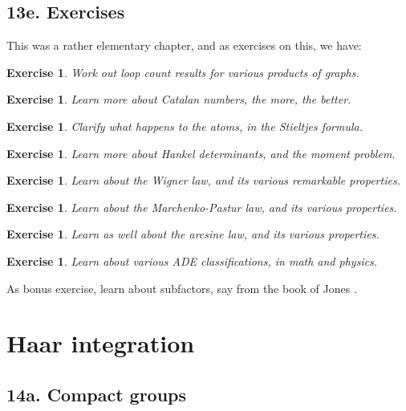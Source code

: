 \documentclass[12pt]{amsbook}
\newtheorem{exercise}[theorem]{Exercise}
\begin{document}
\section*{13e. Exercises}

This was a rather elementary chapter, and as exercises on this, we have:

\begin{exercise}
Work out loop count results for various products of graphs.
\end{exercise}

\begin{exercise}
Learn more about Catalan numbers, the more, the better.
\end{exercise}

\begin{exercise}
Clarify what happens to the atoms, in the Stieltjes formula.
\end{exercise}

\begin{exercise}
Learn more about Hankel determinants, and the moment problem.
\end{exercise}

\begin{exercise}
Learn about the Wigner law, and its various remarkable properties.
\end{exercise}

\begin{exercise}
Learn about the Marchenko-Pastur law, and its various properties.
\end{exercise}

\begin{exercise}
Learn as well about the arcsine law, and its various properties.
\end{exercise}

\begin{exercise}
Learn about various ADE classifications, in math and physics.
\end{exercise}

As bonus exercise, learn about subfactors, say from the book of Jones \cite{jon}.

\chapter{Haar integration}

\section*{14a. Compact groups}
\end{document}
